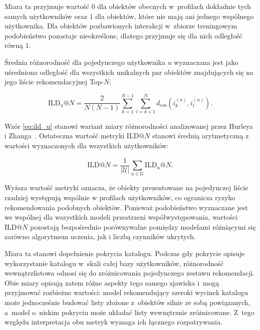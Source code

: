Miara ta przyjmuje wartość $0$ dla obiektów obecnych w~profilach dokładnie tych samych użytkowników oraz $1$ dla obiektów, które nie mają ani jednego wspólnego użytkownika. Dla obiektów pozbawionych interakcji w~zbiorze treningowym podobieństwo pozostaje nieokreślone, dlatego przyjmuje się dla nich odległość równą $1$.

Średnia różnorodność dla pojedynczego użytkownika $u$ wyznaczana jest jako uśredniona odległość dla wszystkich unikalnych par obiektów znajdujących się na jego liście rekomendacyjnej Top-$N$:

\begin{equation}
    \label{eq:ild_u}
    \text{ILD}_u@N = \frac{2}{N(N - 1)} \sum_{k=1}^{N-1} \sum_{l=k+1}^{N} d_{\text{cos}}\left( i_k^{(u)}, i_l^{(u)} \right).
\end{equation}

Wzór \eqref{eq:ild_u} stanowi wariant miary różnorodności analizowanej przez Hurleya i Zhanga~\cite{hurley2011novelty}. Ostateczna wartość metryki $\text{ILD}@N$ stanowi średnią arytmetyczną z wartości wyznaczonych dla wszystkich użytkowników:

\begin{equation} 
    \text{ILD}@N = \frac{1}{|\mathcal{U}|} \sum_{u \in \mathcal{U}} \text{ILD}_u@N.
\end{equation}

Wyższa wartość metryki oznacza, że obiekty prezentowane na pojedynczej liście rzadziej występują wspólnie w profilach użytkowników, co ogranicza ryzyko rekomendowania podobnych obiektów. Ponieważ podobieństwo wyznaczane jest we wspólnej dla wszystkich modeli przestrzeni współwystępowania, wartości $\text{ILD}@N$ pozostają bezpośrednio porównywalne pomiędzy modelami różniącymi się zarówno algorytmem uczenia, jak i liczbą czynników ukrytych.

Miara ta stanowi dopełnienie pokrycia katalogu. Podczas gdy pokrycie opisuje
wykorzystanie katalogu w~skali całej bazy użytkowników, różnorodność
wewnątrzlistowa odnosi się do zróżnicowania pojedynczego zestawu rekomendacji.
Obie miary opisują zatem różne aspekty tego samego zjawiska i~mogą przyjmować
rozbieżne wartości: model rekomendujący szeroki wycinek katalogu może
jednocześnie budować listy złożone z~obiektów silnie ze sobą powiązanych,
a~model o~niskim pokryciu może układać listy wewnętrznie zróżnicowane.
Z~tego względu interpretacja obu metryk wymaga ich łącznego rozpatrywania.